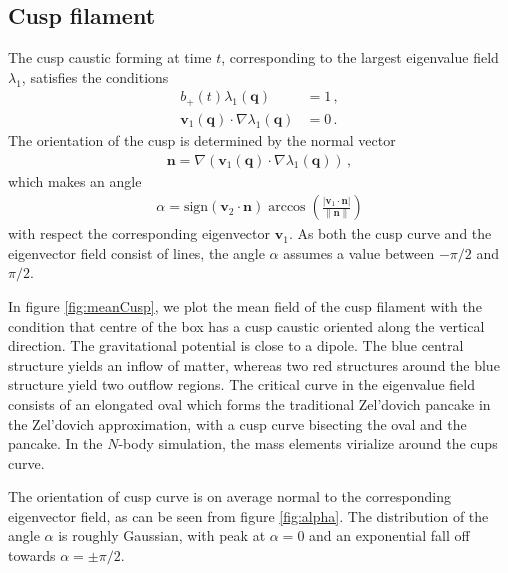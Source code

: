 \documentclass[a4paper, 11pt]{article}
\begin{document}
\subsection{Cusp filament}
The cusp caustic forming at time $t$, corresponding to the largest eigenvalue field $\lambda_1$, satisfies the conditions
\begin{align}
b_+(t) \lambda_1(\bm{q}) &= 1\,, \\
 \bm{v}_1(\bm{q}) \cdot \nabla\lambda_1(\bm{q}) &= 0\,.
\end{align}
The orientation of the cusp is determined by the normal vector
\begin{align}
\bm{n} =  \nabla(\bm{v}_1(\bm{q}) \cdot \nabla\lambda_1(\bm{q}))\,,
\end{align}
which makes an angle 
\begin{align}
\alpha = \text{sign}(\bm{v}_2\cdot \bm{n}) \arccos\left(\frac{|\bm{v}_1\cdot \bm{n}|}{\|\bm{n}\|}\right)
\end{align}
with respect the corresponding eigenvector $\bm{v}_1$. As both the cusp curve and the eigenvector field consist of lines, the angle $\alpha$ assumes a value between $-\pi/2$ and $\pi/2$. 

In figure \ref{fig:meanCusp}, we plot the mean field of the cusp filament with the condition that centre of the box has a cusp caustic oriented along the vertical direction. The gravitational potential is close to a dipole. The blue central structure yields an inflow of matter, whereas two red structures around the blue structure yield two outflow regions. The critical curve in the eigenvalue field consists of an elongated oval which forms the traditional Zel'dovich pancake in the Zel'dovich approximation, with a cusp curve bisecting the oval and the pancake. In the $N$-body simulation, the mass elements virialize around the cups curve.

The orientation of cusp curve is on average normal to the corresponding eigenvector field, as can be seen from figure \ref{fig:alpha}. The distribution of the angle $\alpha$ is roughly Gaussian, with peak at $\alpha =0$ and an exponential fall off towards $\alpha =\pm \pi/2$.
\end{document}
